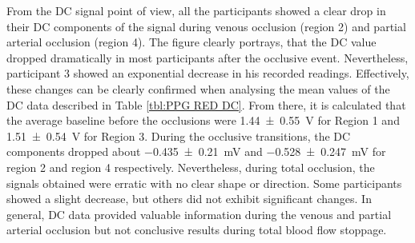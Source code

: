 From the DC signal point of view, all the participants showed a clear drop in their DC components of the signal during venous occlusion (region 2) and partial arterial occlusion (region 4). The figure clearly portrays, that the DC value dropped dramatically in most participants after the occlusive event. Nevertheless, participant 3 showed an exponential decrease in his recorded readings. Effectively, these changes can be clearly confirmed when analysing the mean values of the DC data described in Table \ref{tbl:PPG RED DC}. From there, it is calculated that the average baseline before the occlusions were \SI{1.44(055)}{\volt} for Region 1 and \SI{1.51(054)}{\volt} for Region 3. During the occlusive transitions, the DC components dropped about \SI{-0.435(0210)}{\milli\volt} and \SI{-0.528(0247)}{\milli\volt} for region 2 and region 4 respectively. Nevertheless, during total occlusion, the signals obtained were erratic with no clear shape or direction. Some participants showed a slight decrease, but others did not exhibit significant changes. In general, DC data provided valuable information during the venous and partial arterial occlusion but not conclusive results during total blood flow stoppage. 


